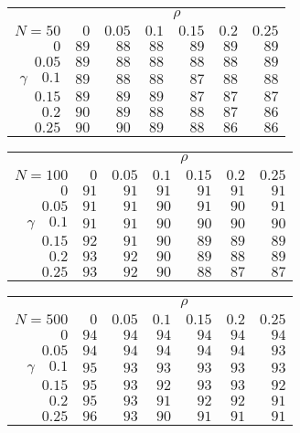 \begin{tabular}{r|rrrrrr}
\hline\hline
 &\multicolumn{6}{c}{$\rho$} \\ 
 $N = 50$ & $0$ & $0.05$ & $0.1$ & $0.15$ & $0.2$ & $0.25$ \\ 
 \hline$0$ & $89$ & $88$ & $88$ & $89$ & $89$ & $89$\\ 
$0.05$ & $89$ & $88$ & $88$ & $88$ & $88$ & $89$\\ 
$\gamma\quad$$0.1$ & $89$ & $88$ & $88$ & $87$ & $88$ & $88$\\ 
$0.15$ & $89$ & $89$ & $89$ & $87$ & $87$ & $87$\\ 
$0.2$ & $90$ & $89$ & $88$ & $88$ & $87$ & $86$\\ 
$0.25$ & $90$ & $90$ & $89$ & $88$ & $86$ & $86$\\ 
 \hline 
 \end{tabular}
 
 \vspace{2em} 
 
\begin{tabular}{r|rrrrrr}
\hline\hline
 &\multicolumn{6}{c}{$\rho$} \\ 
 $N = 100$ & $0$ & $0.05$ & $0.1$ & $0.15$ & $0.2$ & $0.25$ \\ 
 \hline$0$ & $91$ & $91$ & $91$ & $91$ & $91$ & $91$\\ 
$0.05$ & $91$ & $91$ & $90$ & $91$ & $90$ & $91$\\ 
$\gamma\quad$$0.1$ & $91$ & $91$ & $90$ & $90$ & $90$ & $90$\\ 
$0.15$ & $92$ & $91$ & $90$ & $89$ & $89$ & $89$\\ 
$0.2$ & $93$ & $92$ & $90$ & $89$ & $88$ & $89$\\ 
$0.25$ & $93$ & $92$ & $90$ & $88$ & $87$ & $87$\\ 
 \hline 
 \end{tabular}
 
 \vspace{2em} 
 
\begin{tabular}{r|rrrrrr}
\hline\hline
 &\multicolumn{6}{c}{$\rho$} \\ 
 $N = 500$ & $0$ & $0.05$ & $0.1$ & $0.15$ & $0.2$ & $0.25$ \\ 
 \hline$0$ & $94$ & $94$ & $94$ & $94$ & $94$ & $94$\\ 
$0.05$ & $94$ & $94$ & $94$ & $94$ & $94$ & $93$\\ 
$\gamma\quad$$0.1$ & $95$ & $93$ & $93$ & $93$ & $93$ & $93$\\ 
$0.15$ & $95$ & $93$ & $92$ & $93$ & $93$ & $92$\\ 
$0.2$ & $95$ & $93$ & $91$ & $92$ & $92$ & $91$\\ 
$0.25$ & $96$ & $93$ & $90$ & $91$ & $91$ & $91$\\ 
 \hline 
 \end{tabular}
